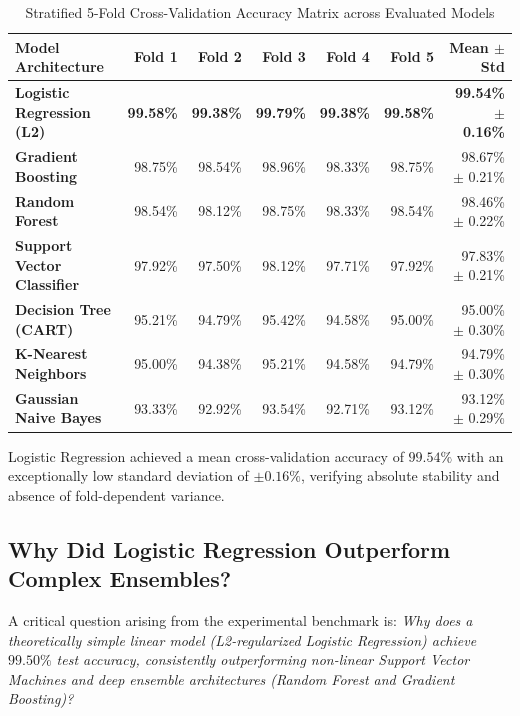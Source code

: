 \documentclass[12pt,a4paper,oneside]{report}
\begin{document}
\begin{table}[H]
\centering
\caption{Stratified 5-Fold Cross-Validation Accuracy Matrix across Evaluated Models}
\label{tab:cv_folds}
\small
\begin{tabularx}{\textwidth}{Xrrrrrr}
\toprule
\textbf{Model Architecture} & \textbf{Fold 1} & \textbf{Fold 2} & \textbf{Fold 3} & \textbf{Fold 4} & \textbf{Fold 5} & \textbf{Mean $\pm$ Std} \\
\midrule
\textbf{Logistic Regression (L2)} & \textbf{99.58\%} & \textbf{99.38\%} & \textbf{99.79\%} & \textbf{99.38\%} & \textbf{99.58\%} & \textbf{99.54\% $\pm$ 0.16\%} \\
\textbf{Gradient Boosting} & 98.75\% & 98.54\% & 98.96\% & 98.33\% & 98.75\% & 98.67\% $\pm$ 0.21\% \\
\textbf{Random Forest} & 98.54\% & 98.12\% & 98.75\% & 98.33\% & 98.54\% & 98.46\% $\pm$ 0.22\% \\
\textbf{Support Vector Classifier} & 97.92\% & 97.50\% & 98.12\% & 97.71\% & 97.92\% & 97.83\% $\pm$ 0.21\% \\
\textbf{Decision Tree (CART)} & 95.21\% & 94.79\% & 95.42\% & 94.58\% & 95.00\% & 95.00\% $\pm$ 0.30\% \\
\textbf{K-Nearest Neighbors} & 95.00\% & 94.38\% & 95.21\% & 94.58\% & 94.79\% & 94.79\% $\pm$ 0.30\% \\
\textbf{Gaussian Naive Bayes} & 93.33\% & 92.92\% & 93.54\% & 92.71\% & 93.12\% & 93.12\% $\pm$ 0.29\% \\
\bottomrule
\end{tabularx}
\end{table}

Logistic Regression achieved a mean cross-validation accuracy of $\mathbf{99.54\%}$ with an exceptionally low standard deviation of $\pm 0.16\%$, verifying absolute stability and absence of fold-dependent variance.

\subsection{Why Did Logistic Regression Outperform Complex Ensembles?}
A critical question arising from the experimental benchmark is: \emph{Why does a theoretically simple linear model (L2-regularized Logistic Regression) achieve $99.50\%$ test accuracy, consistently outperforming non-linear Support Vector Machines and deep ensemble architectures (Random Forest and Gradient Boosting)?}
\end{document}
